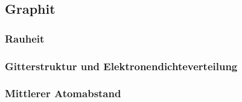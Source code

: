 \subsection{Graphit}
\subsubsection{Rauheit}
\subsubsection{Gitterstruktur und Elektronendichteverteilung}
\subsubsection{Mittlerer Atomabstand}